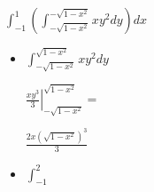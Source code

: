 \documentclass[../practica_08.tex]{subfiles}
\begin{document}
\begin{enumerate}
                $\int_{-1}^1 (\int_{-\sqrt{1-x^2}}^{-\sqrt{1-x^2}} xy^2 dy) dx$

                \begin{itemize}
                    \item $\int_{-\sqrt{1-x^2}}^{\sqrt{1-x^2}} xy^2 dy$
                    
                        $ \left. \frac{xy^3}{3} \right |_{-\sqrt{1-x^2}}^{\sqrt{1-x^2}} = $

                        $ \frac{2x(\sqrt{1-x^2})^3}{3}  $

                    \item $\int_{-1}^2  $

                \end{itemize}

    \end{enumerate}
\end{document}
